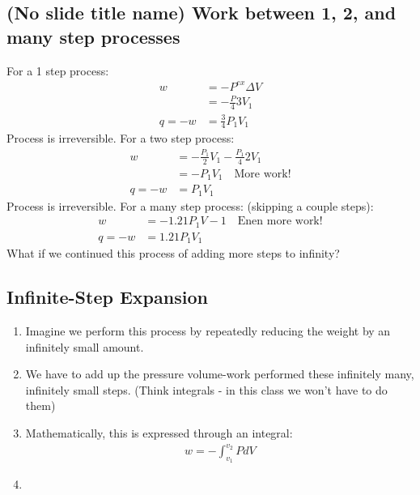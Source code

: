 \documentclass{article}  %
\begin{document}
\subsection*{(No slide title name) Work between 1, 2, and many step processes}
For a 1 step process:
\begin{equation*}
    \begin{aligned}
        w &= -P^{ex}\Delta V \\
        &= -\frac{P}{4} 3V_1 \\
        q = -w &= \frac{3}{4}P_1 V_1
    \end{aligned}
\end{equation*}
Process is irreversible.
For a two step process:
\begin{equation*}
    \begin{aligned}
        w &= -\frac{P_1}{2}V_1 - \frac{P_1}{4}2 V_1 \\
        &= -P_1V_1 \quad \text{More work!} \\
        q = -w &= P_1V_1
    \end{aligned}
\end{equation*}
Process is irreversible.
For a many step process: (skipping a couple steps):
\begin{equation*}
    \begin{aligned}
        w &= -1.21 P_1V-1 \quad \text{Enen more work!} \\
        q = -w &= 1.21 P_1V_1
    \end{aligned}
\end{equation*}
What if we continued this process of adding more steps to infinity?

\subsection*{Infinite-Step Expansion}
\begin{enumerate}
    \item Imagine we perform this process by repeatedly reducing the weight by an infinitely small amount.
    \item We have to add up the pressure volume-work performed these infinitely many, infinitely small steps. (Think integrals - in this class we won't have to do them) 
    \item Mathematically, this is expressed through an integral:
        \begin{equation*}
            \begin{aligned}
                w = -\int ^{v_2}_{v_1} P dV
            \end{aligned}
        \end{equation*}
    \item 
\end{enumerate}
\end{document}
